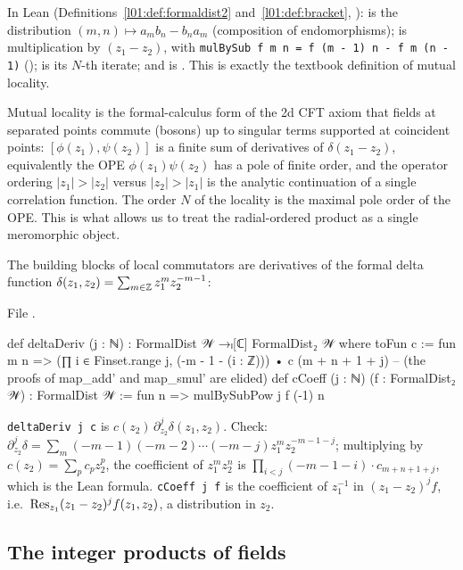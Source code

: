 In Lean (Definitions~\ref{l01:def:formaldist2} and~\ref{l01:def:bracket},
):  is the distribution
$(m,n)\mapsto a_mb_n-b_na_m$ (composition of endomorphisms);  is multiplication by
$(z_1-z_2)$, with \verb|mulBySub f m n = f (m - 1) n - f m (n - 1)| ();
 is its $N$-th iterate; and  is
. This is exactly the textbook definition of
mutual locality.

\begin{physics}
Mutual locality is the formal-calculus form of the 2d CFT axiom that fields at separated points commute (bosons) up to singular terms supported at coincident points: $[\phi(z_1),\psi(z_2)]$ is a finite sum of derivatives of $\delta(z_1-z_2)$, equivalently the OPE $\phi(z_1)\psi(z_2)$ has a pole of finite order, and the operator ordering $|z_1|>|z_2|$ versus $|z_2|>|z_1|$ is the analytic continuation of a single correlation function. The order $N$ of the locality is the maximal pole order of the OPE. This is what allows us to treat the radial-ordered product as a single meromorphic object.
\end{physics}

The building blocks of local commutators are derivatives of the formal delta function
$\delta(z_1,z_2) = \sum_{m\in{\mathbb{Z}}} z_1^m z_2^{-m-1}$:

\noindent File .
\begin{leancode}
def deltaDeriv (j : ℕ) : FormalDist 𝒲 →ₗ[ℂ] FormalDist₂ 𝒲 where
  toFun c := fun m n => (∏ i ∈ Finset.range j, (-m - 1 - (i : ℤ))) • c (m + n + 1 + j)
  -- (the proofs of map_add' and map_smul' are elided)
def cCoeff (j : ℕ) (f : FormalDist₂ 𝒲) : FormalDist 𝒲 := fun n => mulBySubPow j f (-1) n
\end{leancode}

\begin{dictionary}
\verb|deltaDeriv j c| is $c(z_2)\,\partial_{z_2}^j\delta(z_1,z_2)$. Check: $\partial_{z_2}^j
\delta = \sum_m (-m-1)(-m-2)\cdots(-m-j) z_1^m z_2^{-m-1-j}$; multiplying by
$c(z_2)=\sum_p c_p z_2^p$, the coefficient of $z_1^m z_2^n$ is
$\prod_{i<j}(-m-1-i)\cdot c_{m+n+1+j}$, which is the Lean formula. \verb|cCoeff j f| is the
coefficient of $z_1^{-1}$ in $(z_1-z_2)^j f$, i.e.\ $\operatorname{Res}_{z_1}(z_1-z_2)^j f(z_1,z_2)$, a
distribution in $z_2$.
\end{dictionary}

\subsection{The integer products of fields}\label{ch07:sec:prod}

